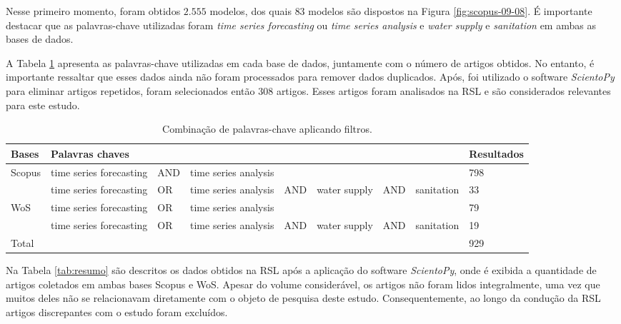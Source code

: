 Nesse primeiro momento, foram obtidos $2.555$ modelos, dos quais $83$ modelos são dispostos na Figura \ref{fig:scopus-09-08}. É importante destacar que as palavras-chave utilizadas foram \textit{time series forecasting} ou \textit{time series analysis} e \textit{water supply} e \textit{sanitation} em ambas as bases de dados. 

A Tabela \ref{tb1} apresenta as palavras-chave utilizadas em cada base de dados, juntamente com o número de artigos obtidos. No entanto, é importante ressaltar que esses dados ainda não foram processados para remover dados duplicados. Após, foi utilizado o software \textit{ScientoPy} para eliminar artigos repetidos, foram selecionados então $308$ artigos. Esses artigos foram analisados na RSL e são considerados relevantes para este estudo.

\begin{table}[!htb]
	\centering
	\caption{Combinação de palavras-chave aplicando filtros.}\label{tb1}
	\begin{tabular}{@{}lp{2cm}lp{2cm}lp{1.5cm}lp{2cm}l@{}}
			\toprule
			Bases                  & \multicolumn{7}{l}{Palavras chaves}                              & Resultados \\ \midrule
			\multirow{2}{*}{Scopus} & time series forecasting & AND & time series analysis &     &              &     &            & 798        \\
			& time series forecasting & OR  & time series analysis & AND & water supply & AND & sanitation & 33         \\
			\multirow{2}{*}{WoS}    & time series forecasting & OR  & time series analysis &     &              &     &            & 79         \\
			& time series forecasting & OR  & time series analysis & AND & water supply & AND & sanitation & 19         \\ \hline
			\multicolumn{8}{l}{Total}                                                                                              & 929        \\ \bottomrule
		\end{tabular}	
\end{table}

Na Tabela \ref{tab:resumo} são descritos os dados obtidos na RSL após a aplicação do software \textit{ScientoPy}, onde é exibida a quantidade de artigos coletados em ambas bases Scopus e WoS. Apesar do volume considerável, os artigos não foram lidos integralmente, uma vez que muitos deles não se relacionavam diretamente com o objeto de pesquisa deste estudo. Consequentemente, ao longo da condução da RSL artigos discrepantes com o estudo foram excluídos.

